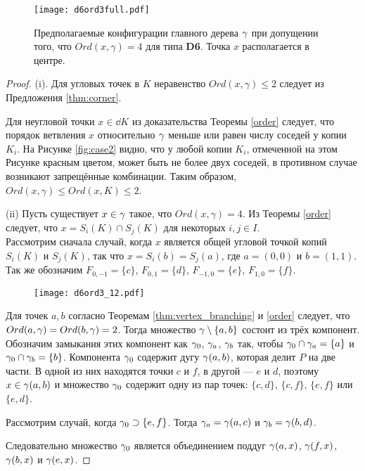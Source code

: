 \begin{figure}[H]
    \centering
    \texttt{[image: d6ord3full.pdf]}
    \caption{Предполагаемые конфигурации главного дерева $\gamma$ при допущении того, что $Ord(x,\gamma)=4$ для типа {\bf D6}. Точка $x$ располагается в центре.}
    \label{fig:d6ord3full}
\end{figure}

\begin{proof}
(i). Для угловых точек в $K$ неравенство $Ord(x,\gamma)\leq2$ следует из Предложения \ref{thm:corner}.

Для неугловой точки $x\in\dd K$ из доказательства Теоремы \ref{order} следует, что порядок ветвления $x$ относительно $\gamma$ меньше или равен числу соседей у копии $K_i$. 
На Рисунке \ref{fig:case2} видно, что у любой копии $K_i$, отмеченной на этом Рисунке красным цветом, может быть не более двух соседей, в противном случае возникают запрещённые комбинации. 
Таким образом, $Ord(x,\gamma)\leq Ord(x,K)\leq2$.

(ii)  Пусть существует $x\in\gamma$ такое, что $Ord(x,\gamma)=4.$
Из Теоремы \ref{order} следует, что  $x=S_i(K)\cap S_j(K)$ для некоторых $i,j\in I$.\\
Рассмотрим сначала случай, когда $x$ является общей угловой точкой копий  $S_i(K)$ и $S_j(K)$, так что $x=S_i(b)=S_j(a)$, где $a=(0,0)$ и $b=(1,1)$. 
Так же обозначим $F_{0,-1}=\{c\}$, $F_{0,1}=\{d\}$, $F_{-1,0}=\{e\}$, $F_{1,0}=\{f\}$.

\begin{figure}[H]
    \centering \texttt{[image: d6ord3\_12.pdf]}
\end{figure}

Для точек $a,b$ согласно Теоремам \ref{thm:vertex_branching} и \ref{order} следует, что $Ord(a,\gamma)=Ord(b,\gamma)=2$. 
Тогда множество $\gamma\setminus\{a,b\}$ состоит из трёх компонент. 
Обозначим замыкания этих компонент как $\gamma_0$, $\gamma_a$, $\gamma_b$ так, чтобы $\gamma_0\cap\gamma_a=\{a\}$ и $\gamma_0\cap \gamma_b=\{b\}$. 
Компонента $\gamma_0$ содержит дугу $\gamma(a,b)$, которая делит $P$ на две части. 
В одной из них находятся точки $c$ и $f$, в другой --- $e$ и $d$, поэтому $x\in \gamma(a,b)$ и множество $\gamma_0$ содержит одну из пар точек: $\{c,d\}$, $\{c,f\}$, $\{e,f\}$ или $\{e,d\}$.

Рассмотрим случай, когда $\gamma_0\supset\{e,f\}$. 
Тогда $\gamma_a=\gamma(a,c)$ и $\gamma_b=\gamma(b,d)$.

Следовательно множество $\gamma_0$ является объединением поддуг $\gamma(a,x)$, $\gamma(f,x)$, $\gamma(b,x)$ и $\gamma(e,x)$.


\end{proof}
